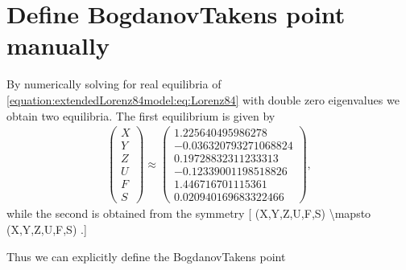 \documentclass[letterpaper,10pt,english]{jupyterBook}
\begin{document}
\begin{sphinxVerbatim}[commandchars=\\\{\}]
\end{sphinxVerbatim}


\section{Define Bogdanov\sphinxhyphen{}Takens point manually}
\label{\detokenize{extendedLorenz84model:define-bogdanov-takens-point-manually}}
\sphinxAtStartPar
By numerically solving for real equilibria of \eqref{equation:extendedLorenz84model:eq:Lorenz84} with double zero
eigenvalues we obtain two equilibria. The first equilibrium is given by
\begin{equation*}
\begin{split}
\begin{pmatrix}
  X \\Y \\Z \\U \\F \\S  
\end{pmatrix}
\approx
\begin{pmatrix}
1.225640495986278 \\ -0.036320793271068824 \\ 0.19728832311233313 \\
-0.12339001198518826 \\ 1.446716701115361 \\ 0.020940169683322466
\end{pmatrix},
\end{split}
\end{equation*}
\sphinxAtStartPar
while the second is obtained from the symmetry
{[}
(X,Y,Z,U,F,S) \textbackslash{}mapsto (X,Y,Z,\sphinxhyphen{}U,F,\sphinxhyphen{}S)
.{]}

\sphinxAtStartPar
Thus we can explicitly define the Bogdanov\sphinxhyphen{}Takens point

\begin{sphinxVerbatim}[commandchars=\\\{\}]
\PYG{p}{[}\PYG{p}{]}
\PYG{p}{[}\PYG{p}{]}
\end{sphinxVerbatim}
\end{document}
